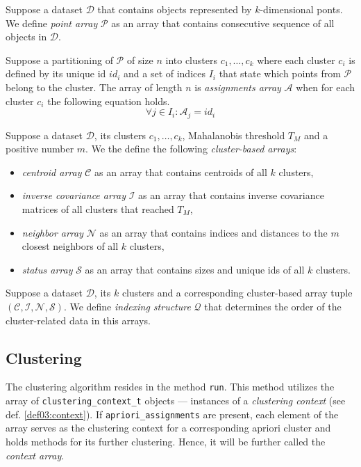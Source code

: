 \begin{defn}
	Suppose a dataset $\mathcal{D}$ that contains objects represented by $k$-di\-men\-si\-onal ponts. We define \emph{point array} $\mathcal{P}$ as an array that contains consecutive sequence of all objects in $\mathcal{D}$.
	\label{def03:point}
\end{defn}

\begin{defn}
	Suppose a partitioning of $\mathcal{P}$ of size $n$ into clusters $c_1,\dots,c_k$ where each cluster $c_i$ is defined by its unique id $id_i$ and a set of indices $I_i$ that state which points from $\mathcal{P}$ belong to the cluster. The array of length $n$ is \emph{assignments array} $\mathcal{A}$ when for each cluster $c_i$ the following equation holds.
	$${\forall j \in I_i : \mathcal{A}_j = id_i}$$
	\label{def03:assign}
\end{defn}

\begin{defn}
	Suppose a dataset $\mathcal{D}$, its clusters $c_1,\dots,c_k$,  Mahalanobis threshold $T_M$ and a positive number $m$. We the define the following \emph{cluster-based arrays}:
	\begin{itemize}
		\item \emph{centroid array} $\mathcal{C}$ as an array that contains centroids of all $k$ clusters,
		\item \emph{inverse covariance array} $\mathcal{I}$ as an array that contains inverse covariance matrices of all clusters that reached $T_M$,
		\item \emph{neighbor array} $\mathcal{N}$ as an array that contains indices and distances to the $m$ closest neighbors of all $k$ clusters,
		\item \emph{status array} $\mathcal{S}$ as an array that contains sizes and unique ids of all $k$ clusters.
	\end{itemize}
	\label{def03:tuple}
\end{defn}

\begin{defn}
	Suppose a dataset $\mathcal{D}$, its $k$ clusters and a corresponding cluster-based array tuple $(\mathcal{C},\mathcal{I},\mathcal{N},\mathcal{S})$. We define \emph{indexing structure} $\mathcal{Q}$ that determines the order of the cluster-related data in this arrays.
	\label{def03:index}
\end{defn}

\subsection{Clustering}
The clustering algorithm resides in the method \texttt{run}. This method utilizes the array of \texttt{clustering\_context\_t} objects --- instances of a \emph{clustering context} (see def. \ref{def03:context}). If \texttt{apriori\_assignments} are present, each element of the array serves as the clustering context for a corresponding apriori cluster and holds methods for its further clustering. Hence, it will be further called the \emph{context array}. 

